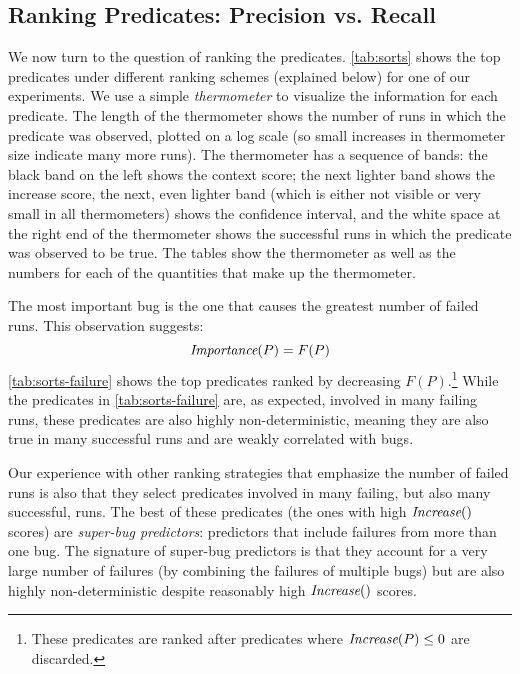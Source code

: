 


\subsection{Ranking Predicates: Precision vs. Recall}
\label{sec:ranking}


We now turn to the question of ranking the predicates.
\autoref{tab:sorts} shows the top
predicates under different ranking schemes (explained below) for one of our
experiments.  We use
a simple {\em thermometer} to visualize the information for each
predicate.  The length of the thermometer shows the number of runs in
which the predicate was observed, plotted on a log scale (so small increases
in thermometer size indicate many more runs).  The thermometer has
a sequence of bands:
the black band on the left shows the context score;
the next lighter band shows the increase score, the next, even  lighter band (which is either not
visible or very small in all thermometers) shows the confidence
interval, and the white space at the right end of the thermometer
shows the successful runs in which the predicate was
observed to be true.  The tables show the thermometer as well as the
numbers for each of the quantities that make up the thermometer. 

The most important bug is the one that causes the greatest number
of failed runs.  This observation suggests:
\[ \textit{Importance}(P) = F(P) \]
\autoref{tab:sorts-failure} shows the top predicates 
ranked by decreasing $F(P)$.\footnote{These predicates are ranked after predicates where $\textit{Increase}(P) \leq 0$ are discarded.}
While the predicates in \autoref{tab:sorts-failure} are, as expected, involved
in many failing runs, these predicates are also highly 
non-deterministic, meaning they are also true in many successful runs
and are weakly correlated with bugs.  

Our experience with other
ranking strategies that emphasize the number of failed runs is also that
they select predicates involved in many failing, but also many
successful, runs.  The best of these predicates (the ones with high
$\textit{Increase}()$ scores) are {\em super-bug predictors}:
predictors that include failures from more than one bug.  The
signature of super-bug predictors is that they account for a very
large number of failures (by combining the failures of multiple bugs)
but are also highly non-deterministic despite reasonably high $\textit{Increase}()$
scores.

